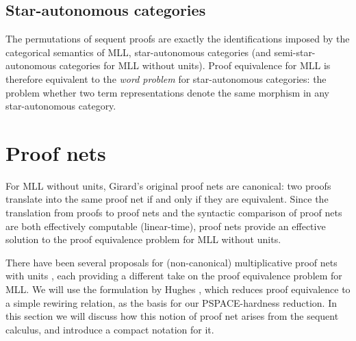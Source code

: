 \documentclass{lmcs}
\let\capsabbrev=\uppercase
\begin{document}

\subsection*{Star-autonomous categories}


The permutations of sequent proofs are exactly the identifications imposed by the categorical semantics of \capsabbrev{mll}, star-autonomous categories \cite{Barr-1991} (and semi-star-autonomous categories \cite{Houston-2008,Heijltjes-Strassburger} for \capsabbrev{mll} without units). Proof equivalence for \capsabbrev{mll} is therefore equivalent to the \emph{word problem} for star-autonomous categories: the problem whether two term representations denote the same morphism in any star-autonomous category.




\section*{Proof nets}


For \capsabbrev{mll} without units, Girard's original proof nets \cite{Girard-1987} are canonical: two proofs translate into the same proof net if and only if they are equivalent. Since the translation from proofs to proof nets and the syntactic comparison of proof nets are both effectively computable (linear-time), proof nets provide an effective solution to the proof equivalence problem for \capsabbrev{mll} without units.

There have been several proposals for (non-canonical) multiplicative proof nets with units \cite{Blute-Cockett-Seely-Trimble-1996, Koh-Ong-1999, Lamarche-Strassburger-2006, Hughes-2012-nets}, each providing a different take on the proof equivalence problem for \capsabbrev{mll}. We will use the formulation by Hughes \cite{Hughes-2012-nets}, which reduces proof equivalence to a simple rewiring relation, as the basis for our PSPACE-hardness reduction. In this section we will discuss how this notion of proof net arises from the sequent calculus, and introduce a compact notation for it.
\end{document}
